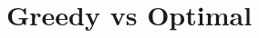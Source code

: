\documentclass{beamer}
\begin{document}


% 
% 
% 
% 
% 
% 
% 
% 
% 
% 
% 
% 
% 
% 
% 

\section{Greedy vs Optimal}



\end{document}
